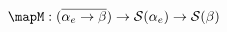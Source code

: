 \documentclass[preview]{standalone}
\begin{document}
\begin{equation*}
  \mapM : (\wrapdf{\alpha_e \rightarrow \beta}) \rightarrow \mathcal{S}(\alpha_e) \rightarrow \mathcal{S}(\beta)
\end{equation*}
\end{document}
